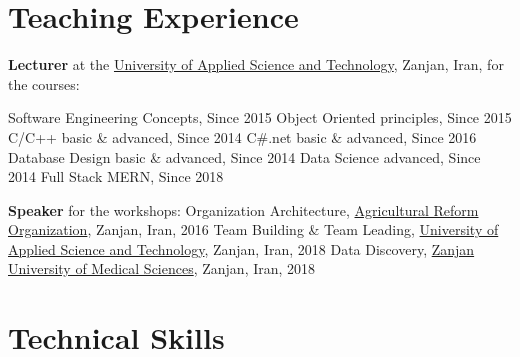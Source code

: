 \documentclass[10pt,a4paper,sans]{moderncv} %
\begin{document}
	\section{Teaching Experience}
	    \cvitem{}
	    {
	        \textbf{Lecturer} at the \href{https://www.uast.ac.ir/en}{University of Applied Science and Technology}, Zanjan, Iran, for the courses:
	    }
	    \begin{multicols}{2}
		        \cvitem{$\bullet$}
		        {
		            Software Engineering Concepts, Since 2015
		        }
		        \cvitem{$\bullet$}
		        {
		            Object Oriented principles, Since 2015
		        }
		        \cvitem{$\bullet$}
		        {
		            C/C++ basic \& advanced, Since 2014
		        }
		        \cvitem{$\bullet$}
		        {
		            C\#.net basic \& advanced, Since 2016
		        }
		        \cvitem{$\bullet$}
		        {
		            Database Design basic \& advanced, Since 2014
		        }
		        \cvitem{$\bullet$}
		        {
		            Data Science advanced, Since 2014
		        }
		        \cvitem{$\bullet$}
		        {
		            Full Stack MERN, Since 2018
		        }
	        \end{multicols}
	        \cvitem{}
	        {
	            \textbf{Speaker} for the workshops:
	        }
		        \cvitem{$\bullet$}
		        {
		            Organization Architecture, \href{http://agrizanjan.ir/mainenglishpage}{Agricultural Reform Organization}, Zanjan, Iran, 2016
		        }
		        \cvitem{$\bullet$}
		        {
		            Team Building \& Team Leading, \href{https://www.uast.ac.ir/en}{University of Applied Science and Technology}, Zanjan, Iran, 2018
		        }
		        \cvitem{$\bullet$}
		        {
		            Data Discovery, \href{http://zums.ac.ir/index.php?slc_lang=en&sid=1}{Zanjan University of Medical Sciences}, Zanjan, Iran, 2018
		        }
	\section{Technical Skills}
\end{document}
